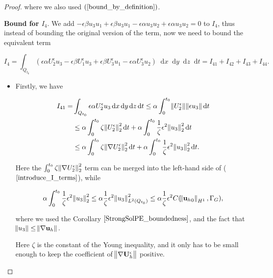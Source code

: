 \documentclass[11pt]{article}
\newcommand*\diff{\mathop{}\!\mathrm{d}}
\begin{document}
\begin{proof}
  where we also used $(\ref{bound_by_definition})$.

  \textbf{Bound for $I_4.$} We add $ - \epsilon \beta u_3 u_1 +  \epsilon \beta u_3 u_1 - \epsilon \alpha u_3 u_2 + \epsilon \alpha u_3 u_2 = 0 $ to $I_4$, thus instead of bounding the original version of the term, now we need to bound the equivalent term

    $$ I_4 = \int_{Q_{t_0}}  ( \epsilon \alpha U_2^\epsilon u_3 - \epsilon \beta U_1^\epsilon u_3 + \epsilon \beta U_3^\epsilon u_1 - \epsilon \alpha U_3^\epsilon u_2 ) \diff x \diff y \diff z \diff t = I_{41} + I_{42} + I_{43} + I_{44}.$$
    
    \begin{itemize}
    
      \item Firstly, we have
      
      \begin{equation}
        \begin{split}
         I_{41} = & \int_{Q_{t_0}} \epsilon \alpha U_2^\epsilon u_3 \diff x \diff y \diff z \diff t \leq \alpha \int_0^{t_0} \norm{U_2^\epsilon} \norm{\epsilon u_3} \diff t \\
          & \leq \alpha \int_0^{t_0} \zeta \norm{U_2^\epsilon}^2_2 \diff t + \alpha \int_0^{t_0} \frac{1}{\zeta} \epsilon^2 \norm{u_3}^2_2 \diff t \\
          & \leq \alpha \int_0^{t_0} \zeta \norm{\nabla U_2^\epsilon}^2_2 \diff t + \alpha \int_0^{t_0} \frac{1}{\zeta} \epsilon^2 \norm{u_3}^2_2 \diff t.
        \end{split}
      \end{equation}
      
      Here the $\int_0^{t_0} \zeta \norm{\nabla U_2^\epsilon}^2_2$  term can be merged into the left-hand side of ($\ref{introduce_I_terms}$), while
      
      $$\alpha \int_0^{t_0} \frac{1}{\zeta} \epsilon^2 \norm{u_3}^2_2 \leq \alpha \frac{1}{\zeta} \epsilon^2 \norm{u_3}^2_{L^2(Q_{t_0})} \leq \alpha \frac{1}{\zeta} \epsilon^2 C(\norm{{\mathbf{u}_h}_0}_{H^1}, \Gamma_G),$$
      
      where we used the Corollary $\ref{StrongSolPE_boundedness}$, and the fact that $\norm{u_3} \leq \norm{\nabla \mathbf{u}_h}.$
      
      Here $\zeta$ is the constant of the Young inequality, and it only has to be small enough to keep the coefficient of $\norm{\nabla \mathbf{U}_h^\epsilon}$ positive.
      

\end{itemize}
\end{proof}
\end{document}
